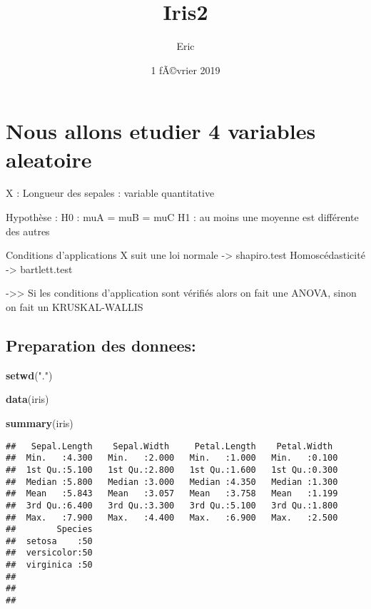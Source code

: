 \documentclass[]{article}
\title{Iris2}
\author{Eric}
\date{1 fÃ©vrier 2019}
\newenvironment{Shaded}{\begin{snugshade}}{\end{snugshade}}
\newcommand{\KeywordTok}[1]{\textcolor[rgb]{0.13,0.29,0.53}{\textbf{#1}}}
\newcommand{\StringTok}[1]{\textcolor[rgb]{0.31,0.60,0.02}{#1}}
\newcommand{\NormalTok}[1]{#1}
\begin{document}
\maketitle

\section{Nous allons etudier 4 variables
aleatoire}\label{nous-allons-etudier-4-variables-aleatoire}

X : Longueur des sepales : variable quantitative

Hypothèse : H0 : muA = muB = muC H1 : au moins une moyenne est
différente des autres

Conditions d'applications X suit une loi normale -\textgreater{}
shapiro.test Homoscédasticité -\textgreater{} bartlett.test

-\textgreater{}\textgreater{} Si les conditions d'application sont
vérifiés alors on fait une ANOVA, sinon on fait un KRUSKAL-WALLIS

\subsection{Preparation des donnees:}\label{preparation-des-donnees}

\begin{Shaded}
\begin{Highlighting}[]
\KeywordTok{setwd}\NormalTok{(}\StringTok{"."}\NormalTok{)}

\KeywordTok{data}\NormalTok{(iris)}
\end{Highlighting}
\end{Shaded}

\begin{Shaded}
\begin{Highlighting}[]
\KeywordTok{summary}\NormalTok{(iris)}
\end{Highlighting}
\end{Shaded}

\begin{verbatim}
##   Sepal.Length    Sepal.Width     Petal.Length    Petal.Width   
##  Min.   :4.300   Min.   :2.000   Min.   :1.000   Min.   :0.100  
##  1st Qu.:5.100   1st Qu.:2.800   1st Qu.:1.600   1st Qu.:0.300  
##  Median :5.800   Median :3.000   Median :4.350   Median :1.300  
##  Mean   :5.843   Mean   :3.057   Mean   :3.758   Mean   :1.199  
##  3rd Qu.:6.400   3rd Qu.:3.300   3rd Qu.:5.100   3rd Qu.:1.800  
##  Max.   :7.900   Max.   :4.400   Max.   :6.900   Max.   :2.500  
##        Species  
##  setosa    :50  
##  versicolor:50  
##  virginica :50  
##                 
##                 
## 
\end{verbatim}
\end{document}
